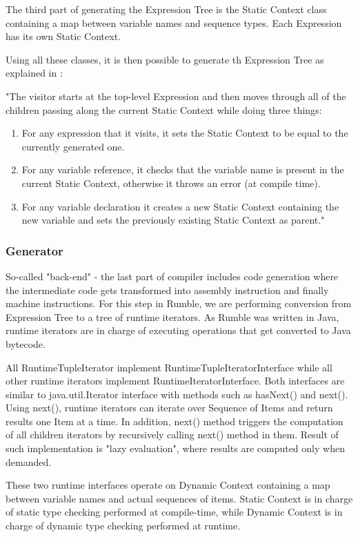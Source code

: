 The third part of generating the Expression Tree is the Static Context class containing a map between variable names and sequence types. Each Expression has its own Static Context.

Using all these classes, it is then possible to generate th Expression Tree as explained in \cite{RumbleThesis}: 

"The visitor starts at the top-level Expression and then moves through all of the children passing along the current Static Context while doing three things:
\begin{enumerate}
	\item For any expression that it visits, it sets the Static Context to be equal to the currently generated one.
	\item For any variable reference, it checks that the variable name is present in the current Static Context, otherwise it throws an error (at compile time).
	\item For any variable declaration it creates a new Static Context containing the new variable and sets the previously existing Static Context as parent."
\end{enumerate}

\subsubsection{Generator}
\label{sec:Generator}
So-called "back-end" - the last part of compiler includes code generation where the intermediate code gets transformed into assembly instruction and finally machine instructions. For this step in Rumble, we are performing conversion from Expression Tree to a tree of runtime iterators. As Rumble was written in Java, runtime iterators are in charge of executing operations that get converted to Java bytecode.

All RuntimeTupleIterator implement RuntimeTupleIteratorInterface while all other runtime iterators implement RuntimeIteratorInterface. Both interfaces are similar to java.util.Iterator interface with methods such as hasNext() and next(). Using next(), runtime iterators can iterate over Sequence of Items and return results one Item at a time. In addition, next() method triggers the computation of all children iterators by recursively calling next() method in them. Result of such implementation is "lazy evaluation", where results are computed only when demanded. 

These two runtime interfaces operate on Dynamic Context containing a map between variable names and actual sequences of items. Static Context is in charge of static type checking performed at compile-time, while Dynamic Context is in charge of dynamic type checking performed at runtime.

